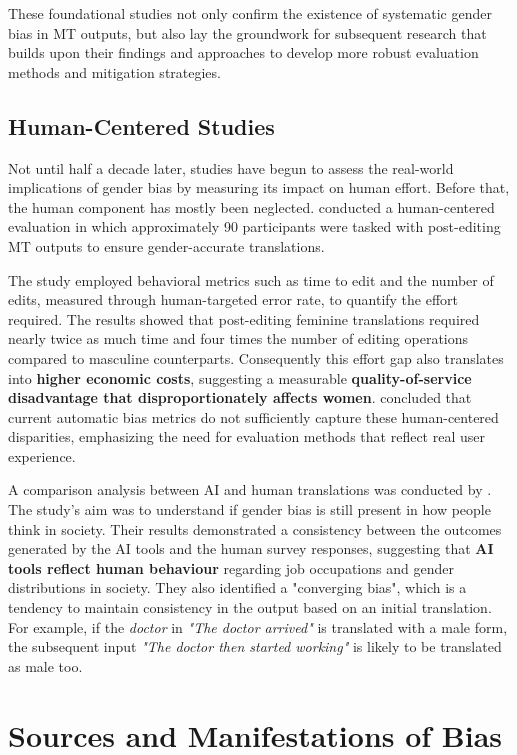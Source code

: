 These foundational studies not only confirm the existence of systematic gender bias in MT outputs, but also lay the groundwork for subsequent research that builds upon their findings and approaches to develop more robust evaluation methods and mitigation strategies.

\subsection{Human-Centered Studies}
Not until half a decade later, studies have begun to assess the real-world implications of gender bias by measuring its impact on human effort. Before that, the human component has mostly been neglected. \citet{savoldiWhatHarmQuantifying2024} conducted a human-centered evaluation in which approximately 90 participants were tasked with post-editing MT outputs to ensure gender-accurate translations.

The study employed behavioral metrics such as time to edit and the number of edits, measured through human-targeted error rate, to quantify the effort required. The results showed that post-editing feminine translations required nearly twice as much time and four times the number of editing operations compared to masculine counterparts. Consequently this effort gap also translates into \textbf{higher economic costs}, suggesting a measurable \textbf{quality-of-service disadvantage that disproportionately affects women}. \citeauthor{savoldiWhatHarmQuantifying2024} concluded that current automatic bias metrics do not sufficiently capture these human-centered disparities, emphasizing the need for evaluation methods that reflect real user experience.

A comparison analysis between AI and human translations was conducted by \citet{smacchiaDoesAIReflect2024}. The study's aim was to understand if gender bias is still present in how people think in society. Their results demonstrated a consistency between the outcomes generated by the AI tools and the human survey responses, suggesting that \textbf{AI tools reflect human behaviour} regarding job occupations and gender distributions in society. They also identified a "converging bias", which is a tendency to maintain consistency in the output based on an initial translation. For example, if the \textit{doctor} in \textit{"The doctor arrived"} is translated with a male form, the subsequent input \textit{"The doctor then started working"} is likely to be translated as male too.


\section{Sources and Manifestations of Bias}

